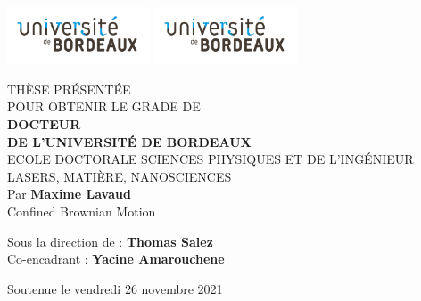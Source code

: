 \begin{titlepage}
\pagestyle{empty}
\includegraphics[scale=1, height=1.7cm]{01_head/images/brdx.pdf}
\hfill
\includegraphics[scale=1, height=1.7cm]{01_head/images/brdx.pdf}
\hfill
\begin{center}
\doublespacing
\begin{Large}

THÈSE PRÉSENTÉE\\ POUR OBTENIR LE GRADE DE \\
{\large \textbf{DOCTEUR\\DE L'UNIVERSITÉ DE BORDEAUX} } \\
\vspace{0.40cm}
ECOLE DOCTORALE SCIENCES PHYSIQUES ET DE L'INGÉNIEUR\\
{\normalsize LASERS, MATIÈRE, NANOSCIENCES} \\
\vspace{0.40cm}
Par \textbf{Maxime Lavaud} \\
\vspace{0.40cm}
{\Large Confined Brownian Motion}
\end{Large}
\vspace{0.40cm}
\begin{normalsize}
\begin{singlespace}
Sous la direction de : \textbf{Thomas Salez}\\
Co-encadrant : \textbf{Yacine Amarouchene}
\end{singlespace}
\end{normalsize}
\end{center}

{\large Soutenue le vendredi 26 novembre 2021 }\\


\end{titlepage}
